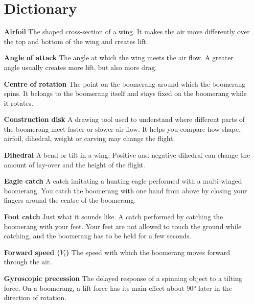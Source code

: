 \chapter{Dictionary}
\newpage
\noindent\textbf{Airfoil} The shaped cross-section of a wing. It makes the air move differently over the top and bottom of the wing and creates lift.

\vspace{0.45em}
\noindent\textbf{Angle of attack} The angle at which the wing meets the air flow. A greater angle usually creates more lift, but also more drag.

\vspace{0.45em}
\noindent\textbf{Centre of rotation} The point on the boomerang around which the boomerang spins. It belongs to the boomerang itself and stays fixed on the boomerang while it rotates.

\vspace{0.45em}
\noindent\textbf{Construction disk} A drawing tool used to understand where different parts of the boomerang meet faster or slower air flow. It helps you compare how shape, airfoil, dihedral, weight or carving may change the flight.

\vspace{0.45em}
\noindent\textbf{Dihedral} A bend or tilt in a wing. Positive and negative dihedral can change the amount of lay-over and the height of the flight.

\vspace{0.45em}
\noindent\textbf{Eagle catch} A catch imitating a hunting eagle performed with a multi-winged boomerang. You catch the boomerang with one hand from above by closing your fingers around the centre of the boomerang.

\vspace{0.45em}
\noindent\textbf{Foot catch} Just what it sounds like. A catch performed by catching the boomerang with your feet. Your feet are not allowed to touch the ground while catching, and the boomerang has to be held for a few seconds.

\vspace{0.45em}
\noindent\textbf{Forward speed ($V_t$)} The speed with which the boomerang moves forward through the air.

\vspace{0.45em}
\noindent\textbf{Gyroscopic precession} The delayed response of a spinning object to a tilting force. On a boomerang, a lift force has its main effect about 90° later in the direction of rotation.

